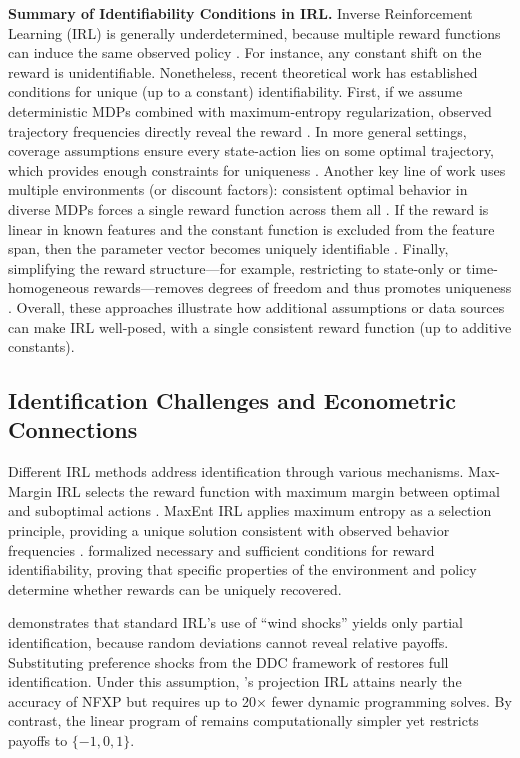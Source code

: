 {\bf Summary of Identifiability Conditions in IRL.} Inverse Reinforcement Learning (IRL) is generally underdetermined, because multiple reward functions can induce the same observed policy \citep{kim2021irl}. For instance, any constant shift on the reward is unidentifiable. Nonetheless, recent theoretical work has established conditions for unique (up to a constant) identifiability. First, if we assume deterministic MDPs combined with maximum-entropy regularization, observed trajectory frequencies directly reveal the reward \citep{kim2021irl}. In more general settings, coverage assumptions ensure every state-action lies on some optimal trajectory, which provides enough constraints for uniqueness \citep{kim2021irl}. Another key line of work uses multiple environments (or discount factors): consistent optimal behavior in diverse MDPs forces a single reward function across them all \citep{cao2021irl,rolland2022_identifiability}. If the reward is linear in known features and the constant function is excluded from the feature span, then the parameter vector becomes uniquely identifiable \citep{rolland2022,shehab2024}. Finally, simplifying the reward structure---for example, restricting to state-only or time-homogeneous rewards---removes degrees of freedom and thus promotes uniqueness \citep{cao2021irl}. Overall, these approaches illustrate how additional assumptions or data sources can make IRL well-posed, with a single consistent reward function (up to additive constants). 

\subsection{Identification Challenges and Econometric Connections}

Different IRL methods address identification through various mechanisms. Max-Margin IRL selects the reward function with maximum margin between optimal and suboptimal actions \citep{Ratliff2006}. MaxEnt IRL applies maximum entropy as a selection principle, providing a unique solution consistent with observed behavior frequencies \citep{Ziebart2008}. \citet{kim2021irl} formalized necessary and sufficient conditions for reward identifiability, proving that specific properties of the environment and policy determine whether rewards can be uniquely recovered.

\citet{OBriant2024} demonstrates that standard IRL’s use of “wind shocks” yields only partial identification, because random deviations cannot reveal relative payoffs. Substituting preference shocks from the DDC framework of \citet{Rust1987} restores full identification. Under this assumption, \citet{Abbeel2004}’s projection IRL attains nearly the accuracy of NFXP but requires up to 20× fewer dynamic programming solves. By contrast, the linear program of \citet{NgRussell2000} remains computationally simpler yet restricts payoffs to \(\{-1, 0, 1\}\).

